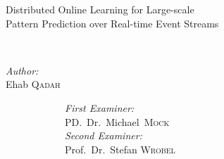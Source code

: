 \begin{titlepage}
\begin{center}
			{ \Large \bfseries 

				Distributed Online Learning for Large-scale  \\Pattern Prediction over Real-time Event Streams}\\[2.9cm]
			
			\begin{minipage}[t]{0.4\textwidth}
				\begin{flushleft} \large
					\emph{Author:}\\
					Ehab \textsc{Qadah}
				\end{flushleft}
			\end{minipage}
			\begin{minipage}[t]{0.5\textwidth}
				\begin{flushleft} \large
					~~~~~~~~~~~~\emph{First Examiner:} \\
					~~~~~~~~~~~~PD.~Dr.~Michael~\textsc{Mock} \\[0.5cm]
					~~~~~~~~~~~~\emph{Second Examiner:} \\
					~~~~~~~~~~~~Prof.~Dr.~Stefan \textsc{Wrobel} \\[0.5cm]
					
				\end{flushleft}
			\end{minipage}
			
			\vfill
			
		
		\end{center}
	\end{titlepage}